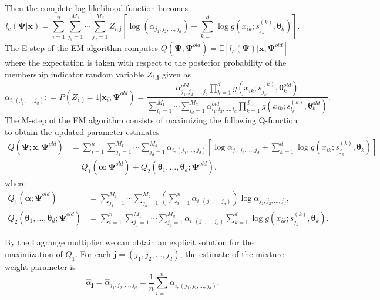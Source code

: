\documentclass[eng]{csam}
\def\a{\alpha}
\def\mE{\mathbb{E}}
\begin{document}
Then the complete log-likelihood function becomes
\begin{equation*}
l_c(\bm{\Psi}|\bm{x}) = \sum_{i=1}^n \sum_{j_1 = 1}^{M_1} \cdots\sum_{j_d = 1}^{M_d} Z_{i,\bm{j}}\left[\log(\a_{j_1,j_2,\ldots,j_d}) + \sum_{k=1}^d \log g(x_{ik};s^{(k)}_{j_k}, \bm{\theta}_k)\right].
\end{equation*}
The E-step of the EM algorithm computes $Q(\bm{\Psi};\bm{\Psi}^{old}) = \mE[l_c(\bm{\Psi}) |\bm{x}, \bm{\Psi}^{old}]$ where the expectation is taken with respect to the posterior probability of the membership indicator random variable $Z_{i,\bm{j}}$ given as
\begin{equation*}
\a_{i,(j_1,\ldots,j_d)} : = P(Z_{i,\bm{j}} = 1 | \bm{x}_i, \bm{\Psi}^{old}) = \frac{\a^{old}_{j_1,j_2,\ldots,j_d} \prod_{k=1}^d g(x_{ik};s^{(k)}_{j_k}, \bm{\theta}^{old}_k)}{\sum_{l_1 = 1}^{M_1} \cdots\sum_{l_d = 1}^{M_d}\a^{old}_{l_1,l_2,\ldots,l_d} \prod_{k=1}^d g(x_{ik};s^{(k)}_{l_k}, \bm{\theta}^{old}_k)}.
\end{equation*}
The M-step of the EM algorithm consists of maximizing the following Q-function to obtain the updated parameter estimates
\begin{align}
Q(\bm{\Psi};\bm{x}, \bm{\Psi}^{old}) &= \sum_{i=1}^n \sum_{j_1 = 1}^{M_1} \cdots\sum_{j_d = 1}^{M_d} \a_{i,(j_1,\ldots,j_d)}\left[\log \a_{j_1,j_2,\ldots,j_d} + \sum_{k=1}^d \log g(x_{ik};s^{(k)}_{j_k}, \bm{\theta}_k)\right] \nonumber\\
&= Q_1(\bm{\a};\bm{\Psi}^{old}) + Q_2(\bm{\theta}_1,\ldots, \bm{\theta}_d;\bm{\Psi}^{old}), \label{Estep}
\end{align}
where
\begin{align*}
Q_1(\bm{\a};\bm{\Psi}^{old}) &= \sum_{j_1 = 1}^{M_1} \cdots\sum_{j_d = 1}^{M_d} \left(\sum_{i=1}^n \a_{i,(j_1,\ldots,j_d)}\right)\log \a_{j_1,j_2,\ldots,j_d},\\
Q_2(\bm{\theta}_1,\ldots, \bm{\theta}_d;\bm{\Psi}^{old}) &= \sum_{i=1}^n \sum_{j_1 = 1}^{M_1} \cdots\sum_{j_d = 1}^{M_d} \a_{i,(j_1,\ldots,j_d)}\sum_{k=1}^d \log g(x_{ik};s^{(k)}_{j_k}, \bm{\theta}_k).
\end{align*}

By the Lagrange multiplier we can obtain an explicit solution for the maximization of $Q_1$. For each $\bm{j} = (j_1,j_2,\ldots,j_d)$, the estimate of the mixture weight parameter is
\begin{equation*}
\hat{\a}_{\bm{j}} = \hat{\a}_{j_1,j_2,\ldots,j_d} = \frac{1}{n} \sum_{i=1}^n \a_{i,(j_1,j_2,\ldots,j_d)}.
\end{equation*}
\end{document}
